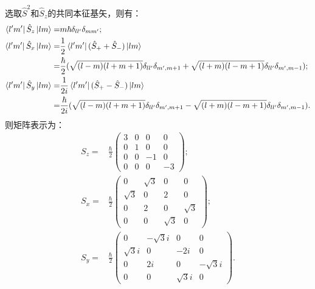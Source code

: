 \documentclass[reqno,a4paper,12pt]{amsart}
\begin{document}
\begin{tcolorbox}[breakable, colback = black!5!white, colframe = black]
选取$\hat{S}^2$和$\hat{S}_z$的共同本征基矢，则有：
\begin{align*}
	\bra{l'm'} \hat{S}_z \ket{lm} =& m\hbar \delta_{ll'} \delta_{mm'}; \\
	\bra{l'm'} \hat{S}_x \ket{lm} =& \frac{1}{2} \bra{l'm'} (\hat{S}_+ + \hat{S}_-) \ket{lm} \\
	=& \frac{\hbar}{2} (\sqrt{(l-m)(l+m+1)} \delta_{ll'} \delta_{m',m+1} + \sqrt{(l+m)(l-m+1)} \delta_{ll'} \delta_{m',m-1}); \\
	\bra{l'm'} \hat{S}_y \ket{lm} =& \frac{1}{2i} \bra{l'm'} (\hat{S}_+ - \hat{S}_-) \ket{lm} \\
	=& \frac{\hbar}{2i} (\sqrt{(l-m)(l+m+1)} \delta_{ll'} \delta_{m',m+1} - \sqrt{(l+m)(l-m+1)} \delta_{ll'} \delta_{m',m-1}).
\end{align*}
则矩阵表示为：
\begin{align*}
	S_z =& \frac{\hbar}{2} \left( \begin{matrix}
		3 & 0 & 0 & 0 \\
		0 & 1 & 0 & 0 \\
		0 & 0 & -1 & 0 \\
		0 & 0 & 0 & -3
	\end{matrix} \right); \\ 
	S_x =& \frac{\hbar}{2} \left( \begin{matrix}
		0 & \sqrt{3} & 0 & 0 \\
		\sqrt{3} & 0 & 2 & 0 \\
		0 & 2 & 0 & \sqrt{3} \\
		0 & 0 & \sqrt{3} & 0
	\end{matrix} \right); \\ 
	S_y =& \frac{\hbar}{2} \left( \begin{matrix}
		0 & -\sqrt{3}i & 0 & 0 \\
		\sqrt{3}i & 0 & -2i & 0 \\
		0 & 2i & 0 & -\sqrt{3}i \\
		0 & 0 & \sqrt{3}i & 0
	\end{matrix} \right).
\end{align*}
\end{tcolorbox}
\end{document}
